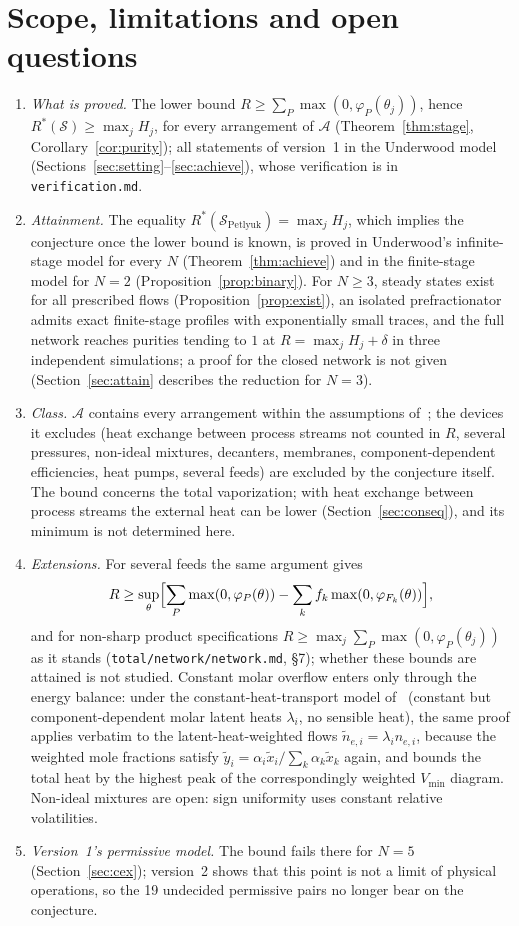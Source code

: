 \section{Scope, limitations and open questions}\label{sec:scope2}
\begin{enumerate}
\item \emph{What is proved.} The lower bound $R\ge\sum_P\max(0,\varphi_P(\theta_j))$, hence $R^*(\mathcal S)\ge\max_jH_j$, for every
arrangement of $\mathcal A$ (Theorem~\ref{thm:stage}, Corollary~\ref{cor:purity}); all statements of version~1 in the
Underwood model (Sections~\ref{sec:setting}--\ref{sec:achieve}), whose verification is in \texttt{verification.md}.
\item \emph{Attainment.} The equality $R^*(\mathcal S_{\mathrm{Petlyuk}})=\max_jH_j$, which implies the conjecture once the lower
bound is known, is proved in Underwood's infinite-stage model for every $N$ (Theorem~\ref{thm:achieve}) and in the
finite-stage model for $N=2$ (Proposition~\ref{prop:binary}). For $N\ge3$, steady states exist for all prescribed flows
(Proposition~\ref{prop:exist}), an isolated prefractionator admits exact finite-stage profiles with exponentially small
traces, and the full network reaches purities tending to $1$ at $R=\max_jH_j+\delta$ in three independent
simulations; a proof for the closed network is not given (Section~\ref{sec:attain} describes the reduction for $N=3$).
\item \emph{Class.} $\mathcal A$ contains every arrangement within the assumptions of~\autocite{HS3}; the devices it excludes
(heat exchange between process streams not counted in $R$, several pressures, non-ideal mixtures, decanters,
membranes, component-dependent efficiencies, heat pumps, several feeds) are excluded by the conjecture itself. The
bound concerns the total vaporization; with heat exchange between process streams the external heat can be lower
(Section~\ref{sec:conseq}), and its minimum is not determined here.
\item \emph{Extensions.} For several feeds the same argument gives
\[R\ge\sup_\theta\Bigl[\sum_P\max(0,\varphi_P(\theta))-\sum_kf_k\max(0,\varphi_{F_k}(\theta))\Bigr],\]
and for non-sharp product specifications $R\ge\max_j\sum_P\max(0,\varphi_P(\theta_j))$ as it
stands (\texttt{total/network/network.md}, \S7); whether these bounds are attained is not studied. Constant molar overflow enters only
through the energy balance: under the constant-heat-transport model of~\autocite{MTA2023} (constant but
component-dependent molar latent heats $\lambda_i$, no sensible heat), the same proof applies verbatim to the
latent-heat-weighted flows $\tilde n_{e,i}=\lambda_in_{e,i}$, because the weighted mole fractions satisfy
$\tilde y_i=\alpha_i\tilde x_i/\sum_k\alpha_k\tilde x_k$ again, and bounds the total heat by the highest peak of the
correspondingly weighted $V_{\min}$ diagram. Non-ideal mixtures are open: sign uniformity uses constant relative
volatilities.
\item \emph{Version~1's permissive model.} The bound fails there for $N=5$ (Section~\ref{sec:cex}); version~2 shows that
this point is not a limit of physical operations, so the 19 undecided permissive pairs no longer bear on the
conjecture.
\end{enumerate}


